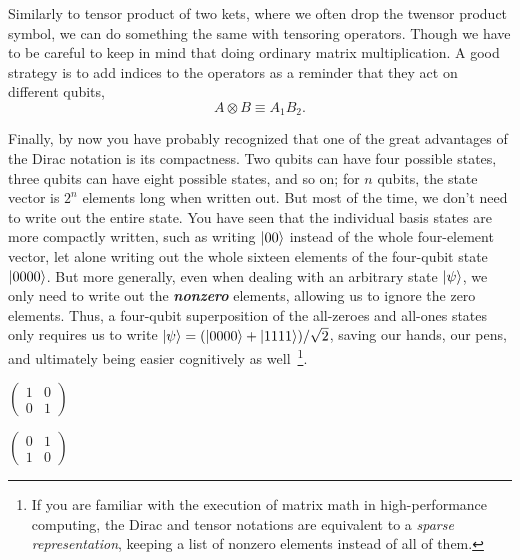 Similarly to tensor product of two kets, where we often drop the twensor product symbol, we can do something the same with tensoring operators.
Though we have to be careful to keep in mind that doing ordinary matrix multiplication.
A good strategy is to add indices to the operators as a reminder that they act on different qubits,
\begin{equation}
    A \otimes B \equiv A_1B_2.
\end{equation}

Finally, by now you have probably recognized that one of the great advantages of the Dirac notation is its compactness. Two qubits can have four possible states, three qubits can have eight possible states, and so on; for $n$ qubits, the state vector is $2^n$ elements long when written out. But most of the time, we don't need to write out the entire state.  You have seen that the individual basis states are more compactly written, such as writing $\left| 00 \right\rangle$ instead of the whole four-element vector, let alone writing out the whole sixteen elements of the four-qubit state $\left| 0000 \right\rangle$. But more generally, even when dealing with an arbitrary state $\left| \psi \right\rangle$, we only need to write out the \textbf{\emph{nonzero}} elements, allowing us to ignore the zero elements.  Thus, a four-qubit superposition of the all-zeroes and all-ones states only requires us to write $\left| \psi \right\rangle = (\left| 0000 \right\rangle + \left| 1111 \right\rangle)/\sqrt{2}$, saving our hands, our pens, and ultimately being easier cognitively as well~\footnote{If you are familiar with the execution of matrix math in high-performance computing, the Dirac and tensor notations are equivalent to a \emph{sparse representation}, keeping a list of nonzero elements instead of all of them.}.

$\left(\begin{array}{ll}
1 & 0 \\
0 & 1
\end{array}\right)$

$\left(\begin{array}{ll}
0 & 1 \\
1 & 0
\end{array}\right)$
\fi

